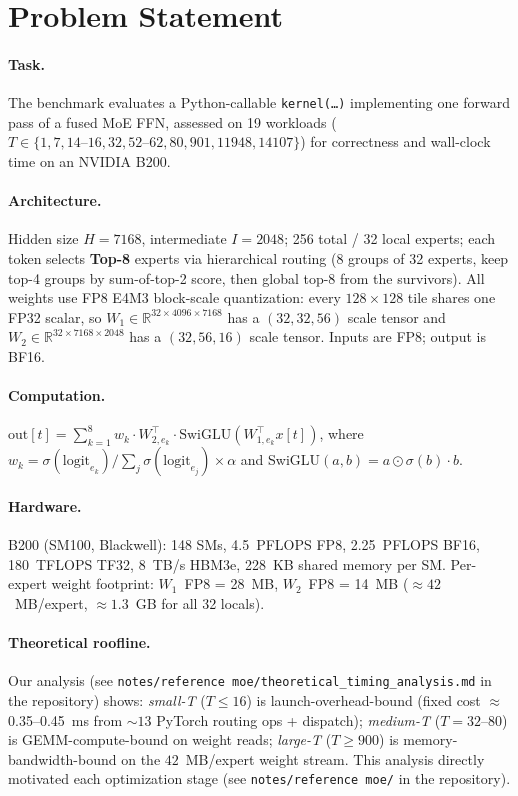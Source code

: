\section{Problem Statement}
\label{sec:problem}

\paragraph{Task.}
The benchmark evaluates a Python-callable \texttt{kernel(\ldots)} implementing one forward pass of a fused MoE FFN, assessed on 19 workloads ($T\!\in\!\{1,7,14\text{--}16,32,52\text{--}62,80,901,11948,14107\}$) for correctness and wall-clock time on an NVIDIA B200.

\paragraph{Architecture.}
Hidden size $H{=}7168$, intermediate $I{=}2048$; 256 total / 32 local experts; each token selects \textbf{Top-8} experts via hierarchical routing (8 groups of 32 experts, keep top-4 groups by sum-of-top-2 score, then global top-8 from the survivors).
All weights use FP8 E4M3 block-scale quantization: every $128\!\times\!128$ tile shares one FP32 scalar, so $W_1 \in \mathbb{R}^{32 \times 4096 \times 7168}$ has a $(32, 32, 56)$ scale tensor and $W_2 \in \mathbb{R}^{32\times7168\times2048}$ has a $(32,56,16)$ scale tensor.
Inputs are FP8; output is BF16.

\paragraph{Computation.}
$\text{out}[t]=\sum_{k=1}^{8}w_k\cdot W_{2,e_k}^\top\cdot\text{SwiGLU}(W_{1,e_k}^\top x[t])$,
where $w_k = \sigma(\text{logit}_{e_k}) / \sum_j \sigma(\text{logit}_{e_j}) \times \alpha$ and SwiGLU$(a,b) = a \odot \sigma(b) \cdot b$.

\paragraph{Hardware.}
B200 (SM100, Blackwell): 148 SMs, 4.5~PFLOPS FP8, 2.25~PFLOPS BF16, 180~TFLOPS TF32, 8~TB/s HBM3e, 228~KB shared memory per SM.
Per-expert weight footprint: $W_1$~FP8 = 28~MB, $W_2$~FP8 = 14~MB (${\approx}42$~MB/expert, ${\approx}1.3$~GB for all 32 locals).

\paragraph{Theoretical roofline.}
Our analysis (see \texttt{notes/reference~moe/theoretical\_timing\_analysis.md} in the repository) shows:
\emph{small-T} ($T\le16$) is launch-overhead-bound (fixed cost ${\approx}$0.35--0.45~ms from ${\sim}13$ PyTorch routing ops + dispatch);
\emph{medium-T} ($T{=}32$--$80$) is GEMM-compute-bound on weight reads;
\emph{large-T} ($T\ge900$) is memory-bandwidth-bound on the $42$~MB/expert weight stream.
This analysis directly motivated each optimization stage
(see \texttt{notes/reference~moe/} in the repository).
